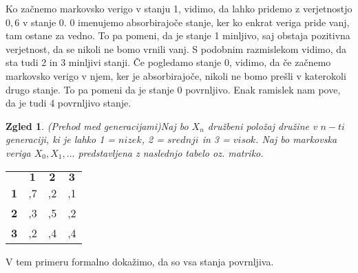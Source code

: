 \documentclass[a4paper,12pt]{article}
\newtheorem{zgled}[izrek]{Zgled}
\begin{document}
Ko začnemo markovsko verigo v stanju 1, vidimo, da lahko pridemo
z verjetnostjo $0{,}6$ v stanje 0. 0 imenujemo absorbirajoče stanje, ker ko enkrat veriga pride vanj, tam ostane za vedno.
To pa pomeni, da je stanje 1 minljivo, saj obstaja pozitivna verjetnost, da se nikoli ne bomo vrnili vanj. 
S podobnim razmislekom vidimo, da sta tudi 2 in 3 minljivi stanji. Če pogledamo stanje 0, vidimo, da če začnemo
markovsko verigo v njem, ker je absorbirajoče, nikoli ne bomo prešli v katerokoli drugo stanje. To pa pomeni da je stanje 0
povrnljivo. Enak ramislek nam pove, da je tudi 4 povrnljivo stanje.


\begin{zgled}
    (Prehod med generacijami)Naj bo $X_n$ družbeni položaj družine v $n-ti$ generaciji, ki je lahko 1 = $nizek$, 2 = $srednji$ in 3 = $visok$. 
    Naj bo markovska veriga $X_0, X_1, ...$ predstavljena z naslednjo tabelo oz. matriko.
\end{zgled}

\begin{center}
    \begin{tabular}{ >{\bfseries}c c c c }
       & $\mathbf{1}$ & $\mathbf{2}$ & $\mathbf{3}$ \\   
     1 & {,}7 & {,}2 & {,}1 \\
     2 & {,}3 & {,}5 & {,}2 \\
     3 & {,}2 & {,}4 & {,}4 
    \end{tabular}
\end{center}

V tem primeru formalno dokažimo, da so vsa stanja povrnljiva.
\end{document}
